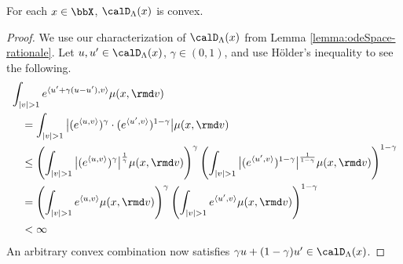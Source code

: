 \begin{lemma}
  \label{lemma:odeSpace-convex}
  For each $\stateVar \in \stateSpace$, $\odeSpace(\stateVar)$ is convex.
\end{lemma}
\begin{proof}
  \label{proof:lemma:odeSpace-convex}
  We use our characterization of $\odeSpace(\stateVar)$ from Lemma \ref{lemma:odeSpace-rationale}.
  Let $\momentVar, \momentVar' \in \odeSpace(\stateVar)$, $\gamma \in (0,1)$, and use H\"older's inequality to see the following.
  \begin{align*}
    &\int_{|\markVar|>1} e^\prj{\momentVar' + \gamma(\momentVar-\momentVar')}{\markVar} \affJump(\stateVar,\rmd\markVar) \\
    &\quad= \int_{|\markVar|>1} \big| (e^\prj{\momentVar}{\markVar})^\gamma \cdot (e^\prj{\momentVar'}{\markVar})^{1-\gamma} \big| \affJump(\stateVar,\rmd\markVar) \\
    &\quad\leq \left( \int_{|\markVar|>1} \big| (e^\prj{\momentVar}{\markVar})^\gamma \big|^{\frac{1}{\gamma}} \affJump(\stateVar, \rmd\markVar) \right)^\gamma \left( \int_{|\markVar|>1} \big| (e^\prj{\momentVar'}{\markVar})^{1-\gamma} \big|^{\frac{1}{1-\gamma}} \affJump(\stateVar,\rmd\markVar)\right)^{1-\gamma} \\
    &\quad= \left( \int_{|\markVar|>1} e^\prj{\momentVar}{\markVar} \affJump(\stateVar, \rmd\markVar) \right)^\gamma \left( \int_{|\markVar|>1}  e^\prj{\momentVar'}{\markVar} \affJump(\stateVar,\rmd\markVar)\right)^{1-\gamma} \\
    &\quad<\infty
  \end{align*}
  An arbitrary convex combination now satisfies $\gamma\momentVar+(1-\gamma)\momentVar' \in \odeSpace(\stateVar)$.
\end{proof}
